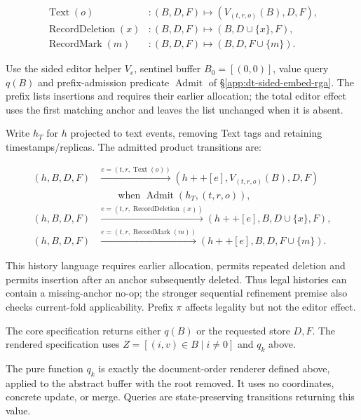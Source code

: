 \[
\begin{aligned}\operatorname{Text}(o)&:(B,D,F)\mapsto(V_{(t,r,o)}(B),D,F),\\\operatorname{RecordDeletion}(x)&:(B,D,F)\mapsto(B,D\cup\{x\},F),\\\operatorname{RecordMark}(m)&:(B,D,F)\mapsto(B,D,F\cup\{m\}).\end{aligned}
\]

Use the sided editor helper $V_e$, sentinel buffer $B_0=[(0,0)]$,
value query $q(B)$ and prefix-admission predicate $\operatorname{Admit}$
of \S\ref{app:dt-sided-embed-rga}. The prefix lists insertions and
requires their earlier allocation; the total editor effect uses the first
matching anchor and leaves the list unchanged when it is absent.

Write $h_T$ for $h$ projected to text events, removing Text tags and retaining timestamps/replicas. The admitted product transitions are:

\[
\begin{aligned}(h,B,D,F)&\xrightarrow{e=(t,r,\operatorname{Text}(o))}(h++[e],V_{(t,r,o)}(B),D,F)\\&\qquad\text{when }\operatorname{Admit}(h_T,(t,r,o)),\\(h,B,D,F)&\xrightarrow{e=(t,r,\operatorname{RecordDeletion}(x))}(h++[e],B,D\cup\{x\},F),\\(h,B,D,F)&\xrightarrow{e=(t,r,\operatorname{RecordMark}(m))}(h++[e],B,D,F\cup\{m\}).\end{aligned}
\]


This history language requires earlier allocation, permits repeated deletion and permits insertion after an anchor subsequently deleted. Thus legal histories can contain a missing-anchor no-op; the stronger sequential refinement premise also checks current-fold applicability. Prefix $\pi$ affects legality but not the editor effect.

The core specification returns either $q(B)$ or the requested store $D,F$.
The rendered specification uses $Z=[(i,v)\in B\mid i\ne0]$ and $q_k$ above.

The pure function $q_k$ is exactly the document-order renderer defined above, applied to the abstract buffer with the root removed. It uses no coordinates, concrete update, or merge. Queries are state-preserving transitions returning this value.

